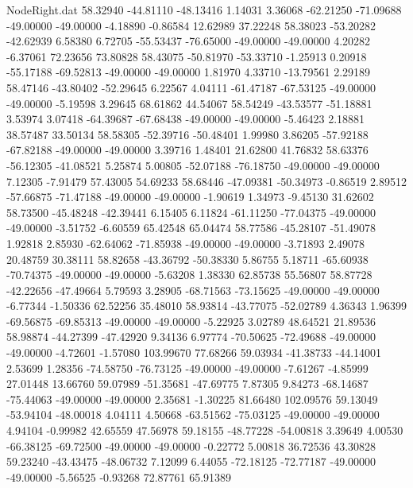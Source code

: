 \begin{filecontents}{NodeRight.dat}
  58.32940  -44.81110  -48.13416     1.14031    3.36068  -62.21250  -71.09688  -49.00000  -49.00000   -4.18890   -0.86584   12.62989   37.22248
  58.38023  -53.20282  -42.62939     6.58380    6.72705  -55.53437  -76.65000  -49.00000  -49.00000    4.20282   -6.37061   72.23656   73.80828
  58.43075  -50.81970  -53.33710    -1.25913    0.20918  -55.17188  -69.52813  -49.00000  -49.00000    1.81970    4.33710  -13.79561    2.29189
  58.47146  -43.80402  -52.29645     6.22567    4.04111  -61.47187  -67.53125  -49.00000  -49.00000   -5.19598    3.29645   68.61862   44.54067
  58.54249  -43.53577  -51.18881     3.53974    3.07418  -64.39687  -67.68438  -49.00000  -49.00000   -5.46423    2.18881   38.57487   33.50134
  58.58305  -52.39716  -50.48401     1.99980    3.86205  -57.92188  -67.82188  -49.00000  -49.00000    3.39716    1.48401   21.62800   41.76832
  58.63376  -56.12305  -41.08521     5.25874    5.00805  -52.07188  -76.18750  -49.00000  -49.00000    7.12305   -7.91479   57.43005   54.69233
  58.68446  -47.09381  -50.34973    -0.86519    2.89512  -57.66875  -71.47188  -49.00000  -49.00000   -1.90619    1.34973   -9.45130   31.62602
  58.73500  -45.48248  -42.39441     6.15405    6.11824  -61.11250  -77.04375  -49.00000  -49.00000   -3.51752   -6.60559   65.42548   65.04474
  58.77586  -45.28107  -51.49078     1.92818    2.85930  -62.64062  -71.85938  -49.00000  -49.00000   -3.71893    2.49078   20.48759   30.38111
  58.82658  -43.36792  -50.38330     5.86755    5.18711  -65.60938  -70.74375  -49.00000  -49.00000   -5.63208    1.38330   62.85738   55.56807
  58.87728  -42.22656  -47.49664     5.79593    3.28905  -68.71563  -73.15625  -49.00000  -49.00000   -6.77344   -1.50336   62.52256   35.48010
  58.93814  -43.77075  -52.02789     4.36343    1.96399  -69.56875  -69.85313  -49.00000  -49.00000   -5.22925    3.02789   48.64521   21.89536
  58.98874  -44.27399  -47.42920     9.34136    6.97774  -70.50625  -72.49688  -49.00000  -49.00000   -4.72601   -1.57080  103.99670   77.68266
  59.03934  -41.38733  -44.14001     2.53699    1.28356  -74.58750  -76.73125  -49.00000  -49.00000   -7.61267   -4.85999   27.01448   13.66760
  59.07989  -51.35681  -47.69775     7.87305    9.84273  -68.14687  -75.44063  -49.00000  -49.00000    2.35681   -1.30225   81.66480  102.09576
  59.13049  -53.94104  -48.00018     4.04111    4.50668  -63.51562  -75.03125  -49.00000  -49.00000    4.94104   -0.99982   42.65559   47.56978
  59.18155  -48.77228  -54.00818     3.39649    4.00530  -66.38125  -69.72500  -49.00000  -49.00000   -0.22772    5.00818   36.72536   43.30828
  59.23240  -43.43475  -48.06732     7.12099    6.44055  -72.18125  -72.77187  -49.00000  -49.00000   -5.56525   -0.93268   72.87761   65.91389

\end{filecontents}
